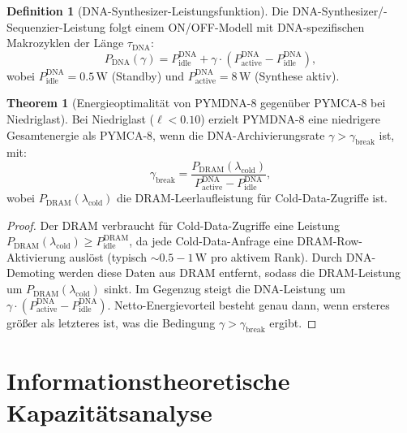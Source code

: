 ﻿\documentclass[a4paper,12pt]{article}
\theoremstyle{definition}
\newtheorem{definition}{Definition}[section]
\newtheorem{theorem}{Theorem}[section]
\begin{document}
\begin{definition}[DNA-Synthesizer-Leistungsfunktion]
  \label{def:dna_power}
  Die DNA-Synthesizer/-Sequenzier-Leistung folgt einem ON/OFF-Modell
  mit DNA-spezifischen Makrozyklen der Länge $\tau_{\mathrm{DNA}}$:
  \begin{equation}
    P_{\mathrm{DNA}}(\gamma) = P_{\mathrm{idle}}^{\mathrm{DNA}}
    + \gamma \cdot (P_{\mathrm{active}}^{\mathrm{DNA}} - P_{\mathrm{idle}}^{\mathrm{DNA}}),
  \end{equation}
  wobei $P_{\mathrm{idle}}^{\mathrm{DNA}} = 0.5\,\mathrm{W}$ (Standby)
  und $P_{\mathrm{active}}^{\mathrm{DNA}} = 8\,\mathrm{W}$ (Synthese aktiv).
\end{definition}

\begin{theorem}[Energieoptimalität von PYMDNA-8 gegenüber PYMCA-8 bei Niedriglast]
  \label{thm:energie_optimal}
  Bei Niedriglast ($\ell < 0.10$) erzielt PYMDNA-8 eine niedrigere
  Gesamtenergie als PYMCA-8, wenn die DNA-Archivierungsrate
  $\gamma > \gamma_{\mathrm{break}}$ ist, mit:
  \begin{equation}
    \gamma_{\mathrm{break}} = \frac{P_{\mathrm{DRAM}}(\lambda_{\mathrm{cold}})}
    {P_{\mathrm{active}}^{\mathrm{DNA}} - P_{\mathrm{idle}}^{\mathrm{DNA}}},
  \end{equation}
  wobei $P_{\mathrm{DRAM}}(\lambda_{\mathrm{cold}})$ die DRAM-Leerlaufleistung
  für Cold-Data-Zugriffe ist.
\end{theorem}

\begin{proof}
  Der DRAM verbraucht für Cold-Data-Zugriffe eine Leistung
  $P_{\mathrm{DRAM}}(\lambda_{\mathrm{cold}}) \ge P_{\mathrm{idle}}^{\mathrm{DRAM}}$,
  da jede Cold-Data-Anfrage eine DRAM-Row-Aktivierung auslöst
  (typisch $\sim 0.5 - 1\,\mathrm{W}$ pro aktivem Rank).
  Durch DNA-Demoting werden diese Daten aus DRAM entfernt,
  sodass die DRAM-Leistung um $P_{\mathrm{DRAM}}(\lambda_{\mathrm{cold}})$
  sinkt. Im Gegenzug steigt die DNA-Leistung um
  $\gamma \cdot (P_{\mathrm{active}}^{\mathrm{DNA}} - P_{\mathrm{idle}}^{\mathrm{DNA}})$.
  Netto-Energievorteil besteht genau dann, wenn ersteres größer als
  letzteres ist, was die Bedingung $\gamma > \gamma_{\mathrm{break}}$ ergibt.
\end{proof}

\section{Informationstheoretische Kapazitätsanalyse}
\end{document}
